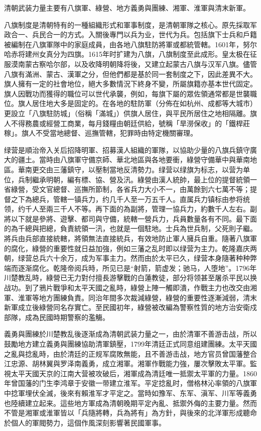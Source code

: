 清朝武装力量主要有八旗軍、綠營、地方義勇與團練、湘軍、淮軍與清末新軍。

八旗制度是清朝特有的一種組織形式和軍事制度，是清朝軍隊之核心。原先採取军政合一、兵民合一的方式。入關後專門以兵为业，世代为兵。包括旗下士兵和戶籍被編制在八旗軍隊中的家庭成員，由各地八旗駐防將軍或都統管轄。1601年，努尔哈赤将建州女真分为四旗。1615年时扩建为八旗，八旗制度至此成形。皇太极在征服漠南蒙古察哈尔部，以及收降明朝降将後，又建立起蒙古八旗与汉军八旗。儘管八旗有滿洲、蒙古、漢軍之分，但他們都是基於同一套制度之下，因此差異不大。旗人擁有一定的社會地位，絕大多數情況下終身不變，所屬旗籍亦基本世代固定。旗人因戰功而獲得的職位可以世代承襲，例如，每旗下屬的眾佐領通常都是世襲職位。旗人居住地大多是固定的。在各地的駐防軍（分佈在如杭州、成都等大城市）更設立「八旗駐防城」（俗稱「滿城」）供旗人居住，與平民所居住之地相隔離。旗人不得務農或經營工商業，每月錢糧由朝廷供給，號稱「旱澇保收」的「鐵桿莊稼」。旗人不受當地總督、巡撫管轄，犯罪時由特定機關審理。

绿营是順治帝入关后招降明軍、招募漢人組織的軍隊，以協助少量的八旗兵鎮守廣大的疆土。當時由八旗軍守備京師、華北地區與各地要衝，綠營守備華中與華南地區。華南更交由三藩鎮守，以壓制當地反清勢力。绿营以绿旗为标志，以营为单位，兵制繼承明朝，編有標、協、營及汛。綠營由漢人統帥，最上位的提督統領一省綠營，受文官總督、巡撫所節制，各省兵力大小不一，由萬餘到六七萬不等；提督之下為總兵，管轄一镇兵力，约几千人至一万五千人。直属兵力镇标由参将统领，约千人至兩三千人不等。再下面的為副將，管理一協兵力，約數千人左右。副將以下就是參將、遊擊、都司與守備，統轄一營兵力，兵員數量各有不同。最下面的為千總與把總，負責統領一汛，也就是一個駐地。士兵為世兵制，父死則子繼。將兵由兵部直接統轄，將領無法直接統兵，有效地防止軍人擁兵自重。隨著八旗軍的腐化，綠營的重要性就日益加強，例如三藩之乱时即以绿营为主力。乾隆嘉庆两朝，绿营总兵六十余万，成为军事主力。然而由於太平已久，绿营本身隨著种种弊端而逐渐腐化。乾隆帝阅兵時，所见已是“射箭，箭虚发；驰马，人堕地”。1796年川楚教乱時，綠營已无力對付擅長游擊戰的白蓮教徒，部分将领甚至屠杀平民以换战功。到了鴉片戰爭和太平天國之亂時，綠營上陣一觸即潰，作戰主力也改交由湘軍、淮軍等地方團練負責。同治年間多次裁減綠營，綠營的重要性逐漸減弱，清末新軍成立後綠營同名存實亡。至民國初年，綠營被改編為警察性質的地方治安衛戍部隊，成為民國時期警察的濫觴。

義勇與團練於川楚教乱後逐渐成為清朝武装力量之一，由於清軍不善游击战，所以鼓勵地方建立義勇與團練協助清軍鎮壓，1799年清廷正式同意组建團練。太平天國之亂與捻亂時，由於清廷的正规军腐敗無能，且不善游击战，地方官员曾国藩整合江忠源、胡林翼與罗泽南義勇，成立湘軍。湘軍作戰能力強，屢次擊敗太平軍。監視太平天國天京的江南大营被攻破后，湘軍成為清廷唯一抵禦太平軍的力量。1860年曾国藩的门生李鸿章于安徽一带建立淮军。平定捻亂时，僧格林沁率領的八旗軍中捻軍埋伏全滅，後來有賴淮军才平定之。當時如豫军、东军、滇军、川军等義勇也陸續建立起来。這些地方軍成為清朝晚期平定內亂、抵禦外侮的主要力量。然而不管是湘軍或淮軍皆以「兵隨將轉，兵為將有」為方針，與後來的北洋軍形成聽命於個人的軍閥勢力，這個作風深刻影響著民國軍事。

